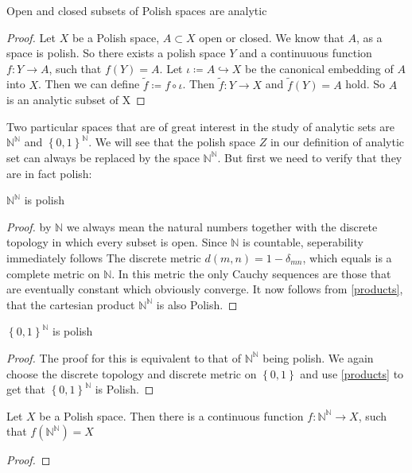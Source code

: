 \documentclass[10pt, a4paper, titlepage]{article}
\numberwithin{equation}{section}
\begin{document}
\begin{theorem}
	Open and closed subsets of Polish spaces are analytic
\end{theorem}

\begin{proof}
	Let $X$ be a Polish space, $A \subset X$ open or closed.
	We know that $A$, as a space is polish. So there exists a polish space $Y$ and a continuuous function  $f:Y\to A$, such that  $f(Y) = A$. 
	Let $\iota  \coloneq A \hookrightarrow X$ be the canonical embedding of  $A$ into  $X$. 
	Then we can define  $\tilde{f}  \coloneq f \circ \iota$. Then  $\tilde{f}:Y \to X $ and  $\tilde{f}(Y) = A$ hold. So  $A$ is an analytic subset of X


\end{proof}

Two particular spaces that are of great interest in the study of analytic sets are $\mathbb{N}^{\mathbb{N}}$ and $\left\{ 0,1 \right\}^{\mathbb{N}} $.
We will see that the polish space $Z$ in our definition of analytic set can always be replaced by the space $\mathbb{N}^{\mathbb{N}}$. But first we need to verify that they are in fact polish:

\begin{theorem}
	$\mathbb{N}^\mathbb{N}$ is polish
\end{theorem}
\begin{proof}
	by $\mathbb{N}$ we always mean the natural numbers together with the discrete topology in which every subset is open. Since $\mathbb{N}$ is countable, seperability immediately follows
	The discrete metric $d\left( m,n \right) = 1 - \delta_{mn} $, which equals is a complete metric on  $\mathbb{N}$.
	In this metric the only Cauchy sequences are those that are eventually constant which obviously converge.
	It now follows from \ref{products}, that the cartesian product $\mathbb{N}^{\mathbb{N}}$ is also Polish.
\end{proof}

\begin{theorem}
	$\left\{ 0,1 \right\}^\mathbb{N}$ is polish
\end{theorem}
\begin{proof}
	The proof for this is equivalent to that of $\mathbb{N}^{\mathbb{N}}$ being polish. We again choose the discrete topology and discrete metric on $\left\{ 0,1 \right\} $ and use \ref{products} to get that $\left\{ 0,1 \right\} ^{\mathbb{N}} $ is Polish.	
\end{proof}


\begin{theorem}
	Let $X$ be a Polish space. Then there is a continuous function $f: \mathbb{N}^\mathbb{N} \to X $, such that $f\left( \mathbb{N}^\mathbb{N} \right) = X$
\end{theorem}
\begin{proof}
	
\end{proof}
\end{document}
